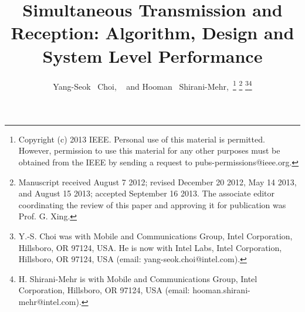 \documentclass[twocolumn]{IEEEtran}
\begin{document}
\title{Simultaneous Transmission and Reception: Algorithm, Design and System Level Performance} 
\author{Yang-Seok ~Choi, ~ and Hooman
~Shirani-Mehr,~\thanks{Copyright (c) 2013 IEEE. Personal use of this material is permitted.
However, permission to use this material for any other purposes must
be obtained from the IEEE by sending a request to
pubs-permissions@ieee.org.}
\thanks{Manuscript received August 7
2012; revised December 20 2012, May 14 2013, and August 15 2013;
accepted September 16 2013. The associate editor coordinating the
review of this paper and approving it for publication was Prof. G. Xing.}
\thanks{Y.-S. Choi was with Mobile and Communications Group, Intel
Corporation, Hillsboro, OR 97124, USA. He is now with Intel Labs,
Intel Corporation, Hillsboro, OR 97124, USA (email:
yang-seok.choi@intel.com).}\thanks{ H. Shirani-Mehr is with Mobile
and Communications Group, Intel Corporation, Hillsboro, OR 97124,
USA (email: hooman.shirani-mehr@intel.com).} }




\maketitle
\end{document}
